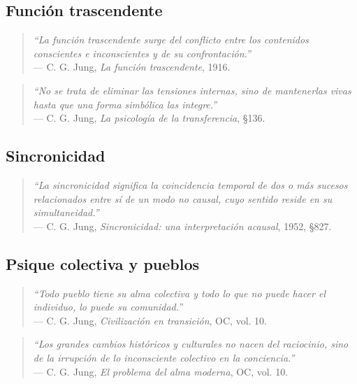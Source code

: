 \subsection*{Función trascendente}

\begin{quote}
	\emph{“La función trascendente surge del conflicto entre los contenidos conscientes e inconscientes y de su confrontación.”} \\
	— C. G. Jung, \emph{La función trascendente}, 1916.
\end{quote}

\begin{quote}
	\emph{“No se trata de eliminar las tensiones internas, sino de mantenerlas vivas hasta que una forma simbólica las integre.”} \\
	— C. G. Jung, \emph{La psicología de la transferencia}, §136.
\end{quote}

\subsection*{Sincronicidad}

\begin{quote}
	\emph{“La sincronicidad significa la coincidencia temporal de dos o más sucesos relacionados entre sí de un modo no causal, cuyo sentido reside en su simultaneidad.”} \\
	— C. G. Jung, \emph{Sincronicidad: una interpretación acausal}, 1952, §827.
\end{quote}

\subsection*{Psique colectiva y pueblos}

\begin{quote}
	\emph{“Todo pueblo tiene su alma colectiva y todo lo que no puede hacer el individuo, lo puede su comunidad.”} \\
	— C. G. Jung, \emph{Civilización en transición}, OC, vol. 10.
\end{quote}

\begin{quote}
	\emph{“Los grandes cambios históricos y culturales no nacen del raciocinio, sino de la irrupción de lo inconsciente colectivo en la conciencia.”} \\
	— C. G. Jung, \emph{El problema del alma moderna}, OC, vol. 10.
\end{quote}

